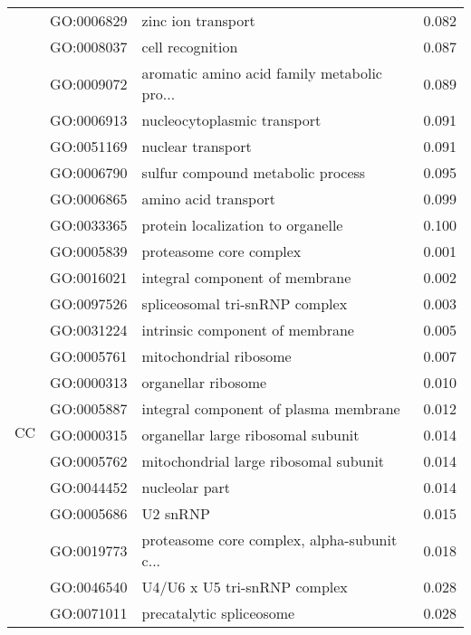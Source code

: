 \begin{longtable}{lllr}
   & GO:0006829 &                           zinc ion transport &         0.082 \\
   & GO:0008037 &                             cell recognition &         0.087 \\
   & GO:0009072 &  aromatic amino acid family metabolic pro... &         0.089 \\
   & GO:0006913 &                  nucleocytoplasmic transport &         0.091 \\
   & GO:0051169 &                            nuclear transport &         0.091 \\
   & GO:0006790 &            sulfur compound metabolic process &         0.095 \\
   & GO:0006865 &                         amino acid transport &         0.099 \\
   & GO:0033365 &            protein localization to organelle &         0.100 \\
\cline{1-4}
\multirow{23}{*}{CC} & GO:0005839 &                      proteasome core complex &         0.001 \\
   & GO:0016021 &               integral component of membrane &         0.002 \\
   & GO:0097526 &               spliceosomal tri-snRNP complex &         0.003 \\
   & GO:0031224 &              intrinsic component of membrane &         0.005 \\
   & GO:0005761 &                       mitochondrial ribosome &         0.007 \\
   & GO:0000313 &                          organellar ribosome &         0.010 \\
   & GO:0005887 &        integral component of plasma membrane &         0.012 \\
   & GO:0000315 &           organellar large ribosomal subunit &         0.014 \\
   & GO:0005762 &        mitochondrial large ribosomal subunit &         0.014 \\
   & GO:0044452 &                               nucleolar part &         0.014 \\
   & GO:0005686 &                                     U2 snRNP &         0.015 \\
   & GO:0019773 &  proteasome core complex, alpha-subunit c... &         0.018 \\
   & GO:0046540 &                 U4/U6 x U5 tri-snRNP complex &         0.028 \\
   & GO:0071011 &                     precatalytic spliceosome &         0.028 \\

\end{longtable}
